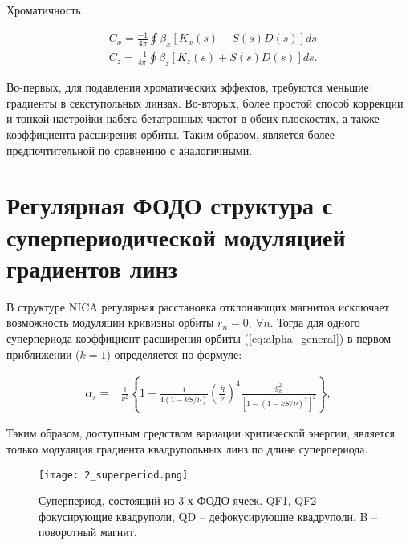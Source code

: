 \par Хроматичность

\begin{equation}
\begin{aligned}
& C_x=\frac{-1}{4 \pi} \oint \beta_x\left[K_x(s)-S(s) D(s)\right] d s \\
& C_z=\frac{-1}{4 \pi} \oint \beta_z\left[K_z(s)+S(s) D(s)\right] d s .
\end{aligned}
\end{equation}

Во-первых, для подавления хроматических эффектов, требуются меньшие градиенты в секступольных линзах.
Во-вторых, более простой способ коррекции и тонкой настройки набега бетатронных частот в обеих плоскостях, а также коэффициента расширения орбиты.
Таким образом, является более предпочтительной по сравнению с аналогичными.


	\section{Регулярная ФОДО структура с суперпериодической модуляцией градиентов линз}\label{sec:transition_variation/methods/FODO}

\par В структуре NICA регулярная расстановка отклоняющих магнитов исключает возможность модуляции кривизны орбиты  $r_n=0, \ \forall n$. Тогда для одного суперпериода коэффициент расширения орбиты (\ref{eq:alpha_general}) в первом приближении ($k=1$) определяется по формуле:

\begin{equation}
\begin{aligned}
\alpha_s= & \frac{1}{\nu^2}\left\{1+\frac{1}{4(1-k S / \nu)}\left(\frac{\bar{R}}{\nu}\right)^4 \frac{g_k^2}{\left[1-(1-k S / \nu)^2\right]^2}\right\},
\end{aligned}
\label{eq:alpha_gradient}
\end{equation}

\noindent Таким образом, доступным средством вариации критической энергии, является только модуляция градиента квадрупольных линз по длине суперпериода.

\begin{figure} [h!]
   \texttt{[image: 2\_superperiod.png]}
   \caption{Суперпериод, состоящий из 3-х ФОДО ячеек. QF1, QF2 – фокусирующие квадруполи, QD –  дефокусирующие квадруполи, B – поворотный магнит.}
   \label{fig:superperiod_3FODO}
\end{figure}

